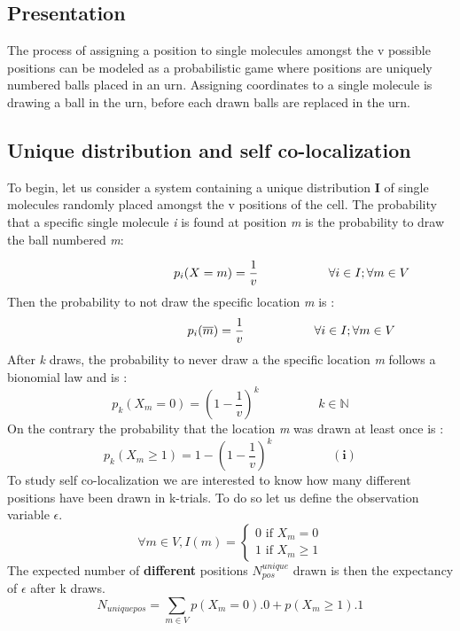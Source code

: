 \documentclass{article}
\begin{document}
\subsection{Presentation}
The process of assigning a position to single molecules amongst the v possible positions can be modeled as a probabilistic game where
positions are uniquely numbered balls placed in an urn. Assigning coordinates to a single molecule is drawing a ball in the urn,
before each drawn balls are replaced in the urn.

\subsection{Unique distribution and self co-localization}
To begin, let us consider a system containing a unique distribution \textbf{I} of single molecules randomly placed amongst the v positions of the cell.
The probability that a specific single molecule \textit{i} is found at position \textit{m} is the probability to draw the ball numbered
\textit{m}:

\[
    \hspace{3.5cm} p_i(X=m) = \frac{1}{v} \hspace{2cm} \forall  i \in I; \forall m \in V
\]
Then the probability to not draw the specific location \textit{m} is :
\[
    \hspace{3.5cm} p_i(\overline{m}) = \frac{1}{v} \hspace{2cm} \forall  i \in I; \forall m \in V
\]
After \textit{k} draws, the probability to never draw a the specific location \textit{m} follows a bionomial law and is :
\[
p_k(X_m = 0) = (1 - \frac{1}{v})^k \hspace{2cm} k \in \mathbb{N}
\]
On the contrary the probability that the location \textit{m} was drawn at least once is :
\[
p_k(X_m \geq 1) = 1-(1 - \frac{1}{v})^k \hspace{2cm} (\textbf{i})
\]
To study self co-localization we are interested to know how many different positions have been drawn in k-trials. To do so let us 
define the observation variable $ \epsilon $.
\[
\forall m \in V, I(m) = \begin{cases}
    0 \text{ if } X_m = 0 \\
    1 \text{ if } X_m \geq 1
\end{cases}
\]
The expected number of \textbf{different} positions $ N^{unique}_{pos} $ drawn is then the expectancy of $ \epsilon $ after k draws.
\[
    N_{uniquepos} = \sum_{m \in V}p(X_m = 0).0 + p(X_m \geq 1).1
\]
\end{document}
